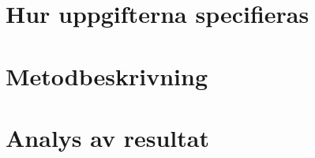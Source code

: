 \documentclass[11pt,a4paper,oneside]{book}
\begin{document}
\section{Hur uppgifterna specifieras}



\section{Metodbeskrivning}



\section{Analys av resultat}

\newpage



\end{document}
